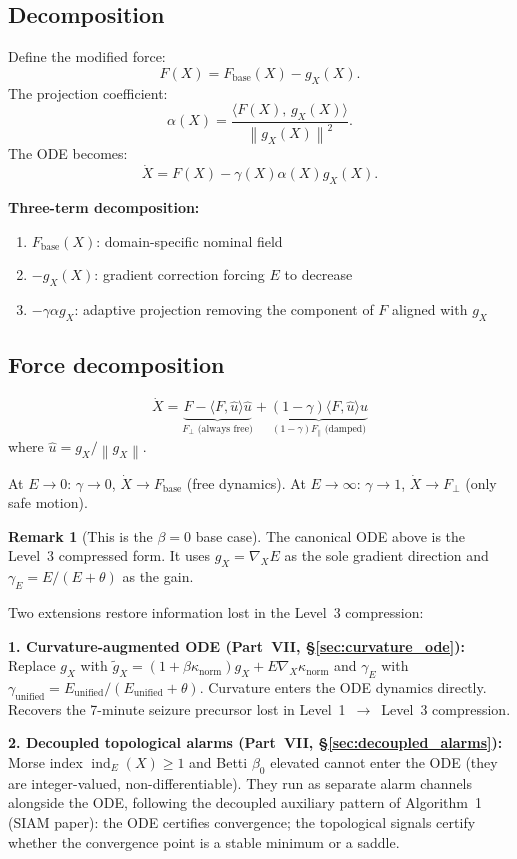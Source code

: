 \documentclass[11pt,a4paper]{article}
\theoremstyle{definition}
\newtheorem{remark}[theorem]{Remark}
\newcommand{\norm}[1]{\left\|#1\right\|}
\newcommand{\inner}[2]{\langle #1,\,#2\rangle}
\newcommand{\Fbase}{F_{\mathrm{base}}}
\newcommand{\gX}{g_X}
\begin{document}
\subsection{Decomposition}

Define the modified force:
\[
F(X) = \Fbase(X) - \gX(X).
\]
The projection coefficient:
\[
\alpha(X) = \frac{\inner{F(X)}{\gX(X)}}{\norm{\gX(X)}^2}.
\]
The ODE becomes:
\[
\dot X = F(X) - \gamma(X)\alpha(X)\gX(X).
\]

\textbf{Three-term decomposition:}
\begin{enumerate}
\item $\Fbase(X)$: domain-specific nominal field
\item $-\gX(X)$: gradient correction forcing $E$ to decrease
\item $-\gamma\alpha\gX$: adaptive projection removing the component of $F$ aligned with $\gX$
\end{enumerate}

\subsection{Force decomposition}

\[
\dot X = \underbrace{F - \langle F,\hat u\rangle\hat u}_{F_\perp \text{ (always free)}}
+ \underbrace{(1-\gamma)\langle F,\hat u\rangle\hat u}_{(1-\gamma)F_\parallel \text{ (damped)}}
\]
where $\hat u = \gX/\norm{\gX}$.

At $E \to 0$: $\gamma \to 0$, $\dot X \to \Fbase$ (free dynamics).
At $E \to \infty$: $\gamma \to 1$, $\dot X \to F_\perp$ (only safe motion).

\begin{remark}[This is the $\beta=0$ base case]
\label{rem:base_case}
The canonical ODE above is the Level~3 compressed form.
It uses $g_X = \nabla_X E$ as the sole gradient direction and
$\gamma_E = E/(E+\theta)$ as the gain.

Two extensions restore information lost in the Level~3 compression:

\textbf{1. Curvature-augmented ODE (Part~VII, §\ref{sec:curvature_ode}):}
Replace $g_X$ with $\tilde g_X = (1+\beta\kappa_\mathrm{norm})g_X + E\nabla_X\kappa_\mathrm{norm}$
and $\gamma_E$ with $\gamma_\mathrm{unified} = E_\mathrm{unified}/(E_\mathrm{unified}+\theta)$.
Curvature enters the ODE dynamics directly.
Recovers the 7-minute seizure precursor lost in Level~1~$\to$~Level~3 compression.

\textbf{2. Decoupled topological alarms (Part~VII, §\ref{sec:decoupled_alarms}):}
Morse index $\operatorname{ind}_{E}(X) \geq 1$ and Betti $\beta_0$ elevated
cannot enter the ODE (they are integer-valued, non-differentiable).
They run as separate alarm channels alongside the ODE,
following the decoupled auxiliary pattern of Algorithm~1 (SIAM paper):
the ODE certifies convergence; the topological signals certify
whether the convergence point is a stable minimum or a saddle.
\end{remark}
\end{document}
